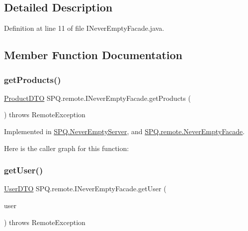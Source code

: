 \subsection{Detailed Description}


Definition at line 11 of file I\+Never\+Empty\+Facade.\+java.



\subsection{Member Function Documentation}
\mbox{\label{interface_s_p_q_1_1remote_1_1_i_never_empty_facade_a62d4a1747b8ba90f451fc9f9343055f3}} 
\subsubsection{\texorpdfstring{get\+Products()}{getProducts()}}
{\footnotesize\ttfamily \mbox{\hyperlink{class_s_p_q_1_1dto_1_1_product_d_t_o}{Product\+D\+TO}} S\+P\+Q.\+remote.\+I\+Never\+Empty\+Facade.\+get\+Products (\begin{DoxyParamCaption}{ }\end{DoxyParamCaption}) throws Remote\+Exception}



Implemented in \mbox{\hyperlink{class_s_p_q_1_1_never_empty_server_ad8c5a0afa259c6b8bcc2eb2444742ca2}{S\+P\+Q.\+Never\+Empty\+Server}}, and \mbox{\hyperlink{class_s_p_q_1_1remote_1_1_never_empty_facade_a4c8bdeeb3d2c3eb2c28aec1043e9274f}{S\+P\+Q.\+remote.\+Never\+Empty\+Facade}}.

Here is the caller graph for this function\+:
\mbox{\label{interface_s_p_q_1_1remote_1_1_i_never_empty_facade_aa329dfc23ab0832e73802bf2df90b9e0}} 
\subsubsection{\texorpdfstring{get\+User()}{getUser()}}
{\footnotesize\ttfamily \mbox{\hyperlink{class_s_p_q_1_1dto_1_1_user_d_t_o}{User\+D\+TO}} S\+P\+Q.\+remote.\+I\+Never\+Empty\+Facade.\+get\+User (\begin{DoxyParamCaption}\item[{\mbox{\hyperlink{class_s_p_q_1_1dto_1_1_user_d_t_o}{User\+D\+TO}}}]{user }\end{DoxyParamCaption}) throws Remote\+Exception}



